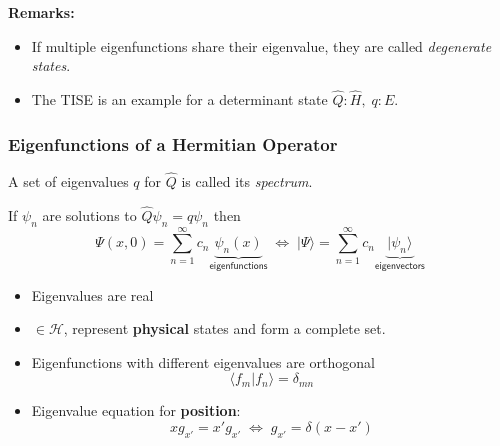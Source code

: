 \textbf{Remarks:}
\begin{itemize}
    \item If multiple eigenfunctions share their eigenvalue, they are called \textit{degenerate states}.
    \item The TISE is an example for a determinant state\newline
          $\hat{Q}: \hat{H},\; q:E$.
\end{itemize}

\subsubsection{Eigenfunctions of a Hermitian Operator}\label{midterm:eig_fun}
A set of eigenvalues $q$ for $\hat{Q}$ is called its \textit{spectrum}.

\newpar{}

If $\psi_n$ are solutions to $\hat{Q}\psi_n=q\psi_n$ then
\noindent\begin{equation*}
    \Psi(x,0)     = \sum_{n=1}^{\infty} c_n \underbrace{\psi_n(x)}_{\textsf{eigenfunctions}} \;\Leftrightarrow\; |\Psi\rangle  = \sum_{n=1}^{\infty} c_n \underbrace{|\psi_n\rangle}_{\textsf{eigenvectors}}
\end{equation*}

\begin{itemize}
    \item Eigenvalues are real
    \item $\in \mathcal{H}$, represent \textbf{physical} states and form a complete set.
    \item Eigenfunctions with different eigenvalues are orthogonal
          \noindent\begin{equation*}
              \langle f_m|f_n\rangle=\delta_{mn}
          \end{equation*}
    \item Eigenvalue equation for \textbf{position}:
          \noindent\begin{equation*}
              \widehat{x}g_{x'}= x'g_{x'}\;\Leftrightarrow\; g_{x'}=\delta(x-x')
          \end{equation*}
\end{itemize}

